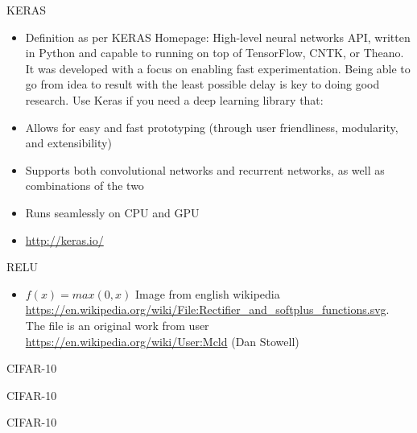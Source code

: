 \documentclass{beamer}{}
\begin{document}
\begin{frame} {KERAS}
    \begin {itemize}[<+->]
        \item Definition as per KERAS Homepage:
            High-level neural networks API, written in Python and capable to running on top of TensorFlow, CNTK, or Theano. It was developed with a focus on enabling fast experimentation. Being able to go from idea to result with the least possible delay is key to doing good research.
            Use Keras if you need a deep learning library that:
        \item Allows for easy and fast prototyping (through user friendliness, modularity, and extensibility)
        \item Supports both convolutional networks and recurrent networks, as well as combinations of the two
        \item Runs seamlessly on CPU and GPU
        \item \url{http://keras.io/}
    \end{itemize}
    \end{frame}

    \begin{frame} {RELU}
    \begin{itemize}
        \item $f(x)=max(0, x)$
    Image from english wikipedia \url{https://en.wikipedia.org/wiki/File:Rectifier_and_softplus_functions.svg}. The file is an original work from user \url{https://en.wikipedia.org/wiki/User:Mcld} (Dan Stowell)
    \end{itemize}
     
    \end{frame}

    \begin{frame} {CIFAR-10}
    \end{frame}

    \begin{frame} {CIFAR-10}
    \end{frame}

    \begin{frame} {CIFAR-10}
    \end{frame}
\end{document}
